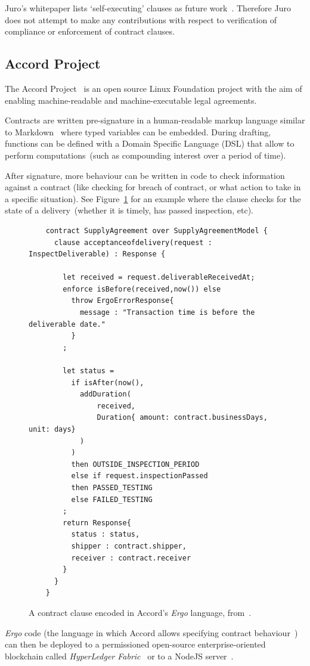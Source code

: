 Juro's whitepaper lists `self-executing' clauses as future work~\cite[p.~6]{juroWhitepaper}.
Therefore Juro does not attempt to make any contributions with respect to verification of compliance or enforcement of
contract clauses.

\subsection{Accord Project}\label{subsec:accord}

The Accord Project~\cite{accordHomepage} is an open source Linux Foundation project with the aim of enabling
machine-readable and machine-executable legal agreements.

Contracts are written pre-signature in a human-readable markup language similar to Markdown~\cite{markdownSpec}
where typed variables can be embedded.
During drafting, functions can be defined with a Domain Specific Language (DSL) that allow to perform
computations~(such as compounding interest over a period of time).

After signature, more behaviour can be written in code to check information against a contract (like checking for
breach of contract, or what action to take in a specific situation).
See Figure~\ref{fig:accord-post-signature-code} for an example where the clause checks for the state of a
delivery~(whether it is timely, has passed inspection, etc).\\

\begin{figure}[th]
    \centering
    \small
    \begin{verbatim}
    contract SupplyAgreement over SupplyAgreementModel {
      clause acceptanceofdelivery(request : InspectDeliverable) : Response {

        let received = request.deliverableReceivedAt;
        enforce isBefore(received,now()) else
          throw ErgoErrorResponse{
            message : "Transaction time is before the deliverable date."
          }
        ;

        let status =
          if isAfter(now(),
            addDuration(
                received,
                Duration{ amount: contract.businessDays, unit: days}
            )
          )
          then OUTSIDE_INSPECTION_PERIOD
          else if request.inspectionPassed
          then PASSED_TESTING
          else FAILED_TESTING
        ;
        return Response{
          status : status,
          shipper : contract.shipper,
          receiver : contract.receiver
        }
      }
    }
    \end{verbatim}
    \caption[Accord contract clause as code]{A contract clause encoded in Accord's \textit{Ergo} language,
        from~\cite{accordAfterSignatureCode}.}
    \label{fig:accord-post-signature-code}
\end{figure}

\textit{Ergo} code (the language in which Accord allows specifying contract behaviour~\cite{accordErgo}) can then be
deployed to a permissioned open-source enterprise-oriented blockchain called \textit{HyperLedger
Fabric}~\cite{hyperledgerFabric_repo, accordFabricDeployDocs} or to a NodeJS server~\cite{accordNodeJSDeployDocs}.

